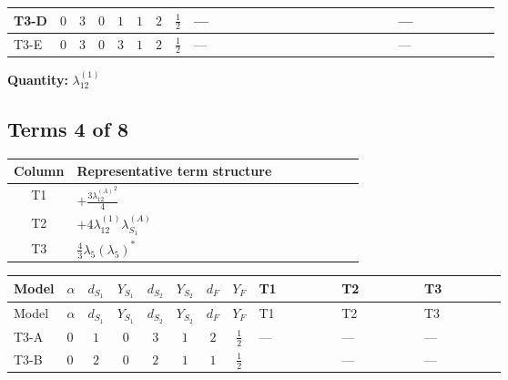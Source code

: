 \documentclass[8pt]{article}
\begin{document}
\begin{landscape}
\begin{longtable}{@{}llcccccc >{\raggedright\arraybackslash}p{0.21\linewidth} >{\raggedright\arraybackslash}p{0.21\linewidth} >{\raggedright\arraybackslash}p{0.21\linewidth}@{}}
\midrule
T3-D & $0$ & $3$ & $0$ & $1$ & $1$ & $2$ & $\frac{1}{2}$ & --- & \scriptsize\adjustbox{max width=\linewidth}{$\begin{gathered} +4 {\lambda_{HS_1}^{(1)}} {\lambda_{HS_2}^{(1)}}\end{gathered}$} & --- \\
\midrule
T3-E & $0$ & $3$ & $0$ & $3$ & $1$ & $2$ & $\frac{1}{2}$ & --- & \scriptsize\adjustbox{max width=\linewidth}{$\begin{gathered} +4 {\lambda_{HS_1}^{(1)}} {\lambda_{HS_2}^{(1)}}\end{gathered}$} & --- \\
\midrule
\bottomrule
\end{longtable}
\clearpage
\noindent\textbf{Quantity: }$\lambda_{12}^{(1)}$\par\smallskip
\subsection*{Terms 4 of 8}
\begin{center}
\begin{tabular}{@{}c >{\raggedright\arraybackslash}p{0.82\linewidth}@{}}
\toprule
Column & Representative term structure \\
\midrule
T1 & \(\displaystyle +\frac{3 {\lambda_{12}^{(A)}}^2}{4}\) \\
\midrule
T2 & \(\displaystyle +4 {\lambda_{12}^{(1)}} {\lambda_{S_1}^{(A)}}\) \\
\midrule
T3 & \(\displaystyle \frac{4}{3} {\lambda_5} \left({\lambda_5}\right)^{*}\) \\
\midrule
\bottomrule
\end{tabular}
\end{center}
\smallskip
\tiny
\begin{longtable}{@{}llcccccc >{\raggedright\arraybackslash}p{0.21\linewidth} >{\raggedright\arraybackslash}p{0.21\linewidth} >{\raggedright\arraybackslash}p{0.21\linewidth}@{}}
\toprule
Model & $\alpha$ & $d_{S_1}$ & $Y_{S_1}$ & $d_{S_2}$ & $Y_{S_2}$ & $d_F$ & $Y_F$ & T1 & T2 & T3 \\
\midrule
\endfirsthead
\toprule
Model & $\alpha$ & $d_{S_1}$ & $Y_{S_1}$ & $d_{S_2}$ & $Y_{S_2}$ & $d_F$ & $Y_F$ & T1 & T2 & T3 \\
\midrule
\endhead
T3-A & $0$ & $1$ & $0$ & $3$ & $1$ & $2$ & $\frac{1}{2}$ & --- & --- & --- \\
\midrule
T3-B & $0$ & $2$ & $0$ & $2$ & $1$ & $1$ & $\frac{1}{2}$ & \scriptsize\adjustbox{max width=\linewidth}{$\begin{gathered} +\frac{3 {\lambda_{12}^{(A)}}^2}{4}\end{gathered}$} & --- & --- \\

\end{longtable}
\end{landscape}
\end{document}
